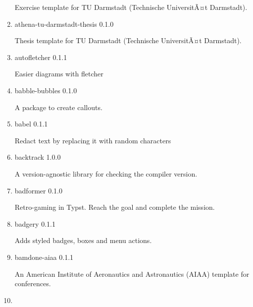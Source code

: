 \begin{enumerate}
  Exercise template for TU Darmstadt (Technische UniversitÃ¤t
  Darmstadt).
\item
  \href{/universe/package/athena-tu-darmstadt-thesis/}{}


  { athena-tu-darmstadt-thesis } { 0.1.0 }

  Thesis template for TU Darmstadt (Technische UniversitÃ¤t Darmstadt).
\item
  \href{/universe/package/autofletcher/}{}

  { autofletcher } { 0.1.1 }

  Easier diagrams with fletcher
\item
  \href{/universe/package/babble-bubbles/}{}

  { babble-bubbles } { 0.1.0 }

  A package to create callouts.
\item
  \href{/universe/package/babel/}{}

  { babel } { 0.1.1 }

  Redact text by replacing it with random characters
\item
  \href{/universe/package/backtrack/}{}

  { backtrack } { 1.0.0 }

  A version-agnostic library for checking the compiler version.
\item
  \href{/universe/package/badformer/}{}


  { badformer } { 0.1.0 }

  Retro-gaming in Typst. Reach the goal and complete the mission.
\item
  \href{/universe/package/badgery/}{}

  { badgery } { 0.1.1 }

  Adds styled badges, boxes and menu actions.
\item
  \href{/universe/package/bamdone-aiaa/}{}


  { bamdone-aiaa } { 0.1.1 }

  An American Institute of Aeronautics and Astronautics (AIAA) template
  for conferences.
\item
  \href{/universe/package/basalt-backlinks/}{}


\end{enumerate}
